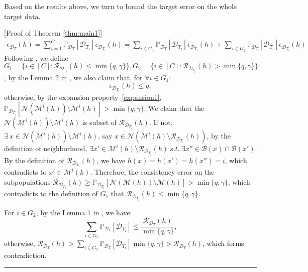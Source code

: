 \documentclass{article}
\newcommand{\BlackBox}{\rule{1.5ex}{1.5ex}}  \fi
\newenvironment{proof}{\par\noindent{\em Proof:\ }}{\hfill\BlackBox\\[.0mm]}
\begin{document}
Based on the results above, we turn to bound the target error on the whole target data.
\begin{proof}[Proof of Theorem \ref{thm:main1}]
\begin{align}\label{thm1:help0}
    \epsilon_{\mathcal{D}_T}(h) = \sum_{i=1}^C \mathbb{P}_{\mathcal{D}_{T}}[\mathcal{D}_{T_i}] \epsilon_{\mathcal{D}_{T_i}}(h)
    =\sum_{i\in G_1} \mathbb{P}_{\mathcal{D}_{T}}[\mathcal{D}_{T_i}] \epsilon_{\mathcal{D}_{T_i}}(h)+\sum_{i\in G_2} \mathbb{P}_{\mathcal{D}_{T}}[\mathcal{D}_{T_i}] \epsilon_{\mathcal{D}_{T_i}}(h)
\end{align}
Following \cite{NIPS_2021_cycle}, we define $G_1 = \{i\in [C]: \mathcal{R}_{\mathcal{D}_{T_i}}(h)\leq \min{\{q,\gamma\}} \}, G_2 = \{i\in [C]: \mathcal{R}_{\mathcal{D}_{T_i}}(h)> \min{\{q,\gamma\}} \}$
, by the Lemma 2 in \cite{NIPS_2021_cycle}, we also claim that, for $\forall i \in G_1$:
\begin{equation}\label{thm1:help1}
    \epsilon_{\mathcal{D}_{T_i}}(h)\leq q,
\end{equation}
otherwise, by the expansion property~\ref{expansion1}, $\mathbb{P}_{\mathcal{D}_{T_i}}[\mathcal{N}(\mathcal{M}^i(h))\setminus \mathcal{M}^i(h)]>\min\{q,\gamma \}$.
We claim that the $\mathcal{N}(\mathcal{M}^i(h))\setminus \mathcal{M}^i(h)$ is subset of $\mathcal{R}_{\mathcal{D}_{T_i}}(h)$. If not, $\exists \ x\in \mathcal{N}(\mathcal{M}^i(h))\setminus \mathcal{M}^i(h)$, say $ x \in \mathcal{N}( \mathcal{M}^i(h)\setminus \mathcal{R}_{\mathcal{D}_{T_i}}(h))$, by the definition of neighborhood, $\exists x'\in \mathcal{M}^i(h)\setminus \mathcal{R}_{\mathcal{D}_{T_i}}(h) \ s.t.  \ \exists  x''\in \mathcal{B}(x)\cap \mathcal{B}(x')$. By the definition of $\mathcal{R}_{\mathcal{D}_{T_i}}(h)$, we have $h(x) = h(x') = h(x'')=i$, which contradicts to $x'\in \mathcal{M}^i(h)$. Therefore, the consistency error on the subpopulations $\mathcal{R}_{\mathcal{D}_{T_i}}(h)\geq \mathbb{P}_{\mathcal{D}_{T_i}}[\mathcal{N}(\mathcal{M}(h))\setminus \mathcal{M}(h)]>\min\{q,\gamma \}$, which contradicts to the definition of $G_1$ that $\mathcal{R}_{\mathcal{D}_{T_i}}(h)\leq\min \{q,\gamma \}$. 

For $i\in G_2$, by the Lemma 1 in \cite{NIPS_2021_cycle}, we have:
\begin{equation}\label{thm1:help2}
    \sum_{i \in G_2} \mathbb{P}_{\mathcal{D}_{T}}[\mathcal{D}_{T_i}] \leq \frac{\mathcal{R}_{\mathcal{D}_T}(h)}{\min{\{q,\gamma\}}},
\end{equation}
otherwise, $\mathcal{R}_{\mathcal{D}_T}(h)> \sum_{i\in G_2}\mathbb{P}_{\mathcal{D}_T}[\mathcal{D}_{T_i}]\min{\{q,\gamma\}}>\mathcal{R}_{\mathcal{D}_T}(h)$, which forms contradiction.


\end{proof}
\end{document}
